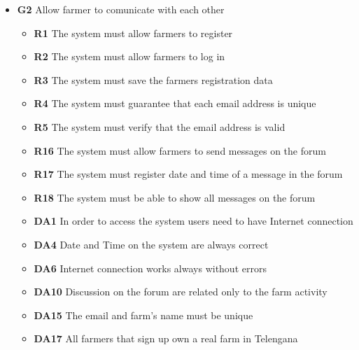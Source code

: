 \begin{itemize}
    \item \textbf{G2} Allow farmer to comunicate with each other
        \begin{itemize}
            \renewcommand\labelitemi{--}
            \item \textbf{R1} The system must allow farmers to register
            \item \textbf{R2} The system must allow farmers to log in
            \item \textbf{R3} The system must save the farmers registration data
            \item \textbf{R4} The system must guarantee that each email address is unique
            \item \textbf{R5} The system must verify that the email address is valid
            \item \textbf{R16} The system must allow farmers to send messages on the forum
            \item \textbf{R17} The system must register date and time of a message in the forum
            \item \textbf{R18} The system must be able to show all messages on the forum
            \item \textbf{DA1} In order to access the system users need to have Internet connection
            \item \textbf{DA4} Date and Time on the system are always correct
            \item \textbf{DA6} Internet connection works always without errors
            \item \textbf{DA10} Discussion on the forum are related only to the farm activity
            \item \textbf{DA15} The email and farm's name must be unique
            \item \textbf{DA17} All farmers that sign up own a real farm in Telengana
        \end{itemize}    
    

\end{itemize}
